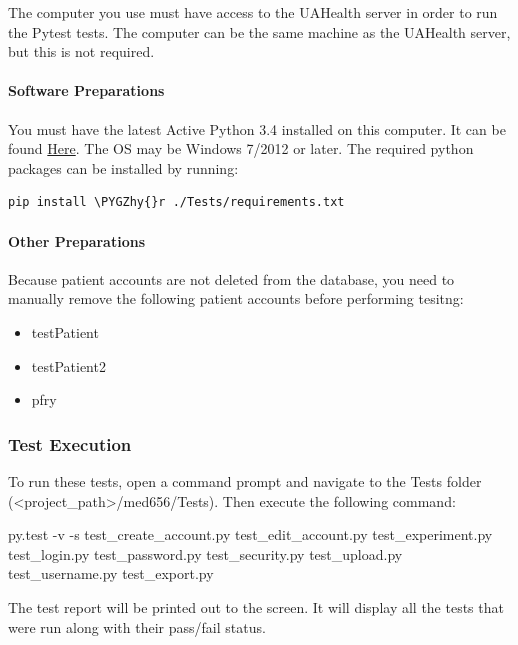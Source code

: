 \documentclass[letterpaper,10pt,english]{sphinxmanual}
\def\PYGZhy{\char`\-}
\begin{document}
The computer you use must have access to the UAHealth server in order to run the Pytest tests.
The computer can be the same machine as the UAHealth server, but this is not required.


\paragraph{Software Preparations}
\label{STD/pytest_test_descriptions:software-preparations}
You must have the latest Active Python 3.4 installed on this computer. It can be found \href{http://www.activestate.com/activepython/downloads}{Here}. The OS may be Windows
7/2012 or later. The required python packages can be installed by running:

\begin{Verbatim}[commandchars=\\\{\}]
pip install \PYGZhy{}r ./Tests/requirements.txt
\end{Verbatim}


\paragraph{Other Preparations}
\label{STD/pytest_test_descriptions:other-preparations}\label{STD/pytest_test_descriptions:here}
Because patient accounts are not deleted from the database, you need to manually remove the following patient accounts
before performing tesitng:
\begin{itemize}
\item {} 
testPatient

\item {} 
testPatient2

\item {} 
pfry

\end{itemize}


\subsubsection{Test Execution}
\label{STD/pytest_test_descriptions:test-execution}
To run these tests, open a command prompt and navigate to the Tests folder (\textless{}project\_path\textgreater{}/med656/Tests). Then execute
the following command:

py.test -v -s test\_create\_account.py test\_edit\_account.py test\_experiment.py test\_login.py test\_password.py test\_security.py test\_upload.py test\_username.py test\_export.py

The test report will be printed out to the screen. It will display all the tests that were run along with their pass/fail
status.
\end{document}

